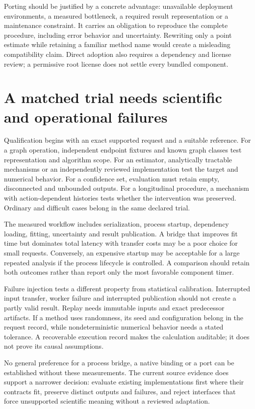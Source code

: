 Porting should be justified by a concrete advantage: unavailable deployment
environments, a measured bottleneck, a required result representation or a
maintenance constraint. It carries an obligation to reproduce the complete
procedure, including error behavior and uncertainty. Rewriting only a point
estimate while retaining a familiar method name would create a misleading
compatibility claim. Direct adoption also requires a dependency and license
review; a permissive root license does not settle every bundled component.

\section{A matched trial needs scientific and operational failures}

Qualification begins with an exact supported request and a suitable reference.
For a graph operation, independent endpoint fixtures and known graph classes
test representation and algorithm scope. For an estimator, analytically
tractable mechanisms or an independently reviewed implementation test the
target and numerical behavior. For a confidence set, evaluation must retain
empty, disconnected and unbounded outputs. For a longitudinal procedure, a
mechanism with action-dependent histories tests whether the intervention was
preserved. Ordinary and difficult cases belong in the same declared trial.

The measured workflow includes serialization, process startup, dependency
loading, fitting, uncertainty and result publication. A bridge that improves
fit time but dominates total latency with transfer costs may be a poor choice
for small requests. Conversely, an expensive startup may be acceptable for a
large repeated analysis if the process lifecycle is controlled. A comparison
should retain both outcomes rather than report only the most favorable
component timer.

Failure injection tests a different property from statistical calibration.
Interrupted input transfer, worker failure and interrupted publication should
not create a partly valid result. Replay needs immutable inputs and exact
predecessor artifacts. If a method uses randomness, its seed and configuration
belong in the request record, while nondeterministic numerical behavior needs
a stated tolerance. A recoverable execution record makes the calculation
auditable; it does not prove its causal assumptions.

No general preference for a process bridge, a native binding or a port can
be established without these measurements. The current source evidence does
support a narrower decision: evaluate existing implementations first where
their contracts fit, preserve distinct outputs and failures, and reject
interfaces that force unsupported scientific meaning without a reviewed
adaptation.

